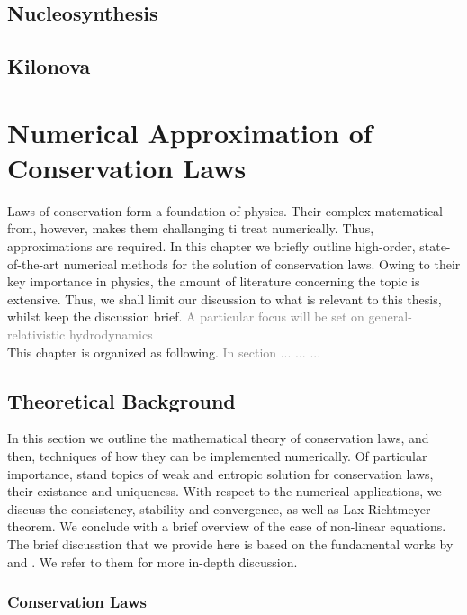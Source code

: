 \documentclass[11pt,a4paper,headinclude=true,DIV=14,BCOR=8mm,chapterprefix,listof=totoc,twoside,openright,abstracton]{scrbook}
\newcommand{\gray}[1]{\textcolor{gray}{#1}}
\begin{document}
\section{Nucleosynthesis}
\section{Kilonova}




\chapter{Numerical Approximation of Conservation Laws}
\label{ch:theory:grhd_num_methods}

Laws of conservation form a foundation of physics. Their complex matematical from, however, makes them challanging ti treat numerically. Thus, approximations are required. In this chapter we briefly outline high-order, state-of-the-art numerical methods for the solution of conservation laws. Owing to their key importance in physics, the amount of literature concerning the topic is extensive. Thus, we shall limit our discussion to what is relevant to this thesis, whilst keep the discussion brief. \gray{A particular focus will be set on general-relativistic hydrodynamics} \\

This chapter is organized as following. \gray{In section ... ... ... }

\section{Theoretical Background}
\label{sec:theory:conserv_laws:theorback}

In this section we outline the mathematical theory of conservation laws, and then, techniques of how they can be implemented numerically. Of particular importance, stand topics of weak and entropic solution for conservation laws, their existance and uniqueness. With respect to the numerical applications, we discuss the consistency, stability and convergence, as well as Lax-Richtmeyer theorem. We conclude with a brief overview of the case of non-linear equations. The brief discusstion that we provide here is based on the fundamental works by \cite{LeVeque:1992} and \cite{Tadmor1998}. We refer to them for more in-depth discussion. 

\subsection{Conservation Laws}
\end{document}
